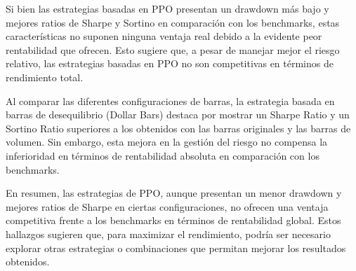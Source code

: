 \documentclass[a4paper,12pt, twoside]{report}
\begin{document}
Si bien las estrategias basadas en PPO presentan un drawdown más bajo y mejores ratios de Sharpe y Sortino en comparación 
con los benchmarks, estas características no suponen ninguna ventaja real debido a la evidente peor rentabilidad que ofrecen. 
Esto sugiere que, a pesar de manejar mejor el riesgo relativo, las estrategias basadas en PPO no son competitivas en términos 
de rendimiento total.

Al comparar las diferentes configuraciones de barras, la estrategia basada en barras de desequilibrio (Dollar Bars) 
destaca por mostrar un Sharpe Ratio y un Sortino Ratio superiores a los obtenidos con las barras originales y las barras de volumen. 
Sin embargo, esta mejora en la gestión del riesgo no compensa la inferioridad en términos de rentabilidad absoluta en comparación con los benchmarks.

En resumen, las estrategias de PPO, aunque presentan un menor drawdown y mejores ratios de Sharpe en ciertas 
configuraciones, no ofrecen una ventaja competitiva frente a los benchmarks en términos de rentabilidad global. 
Estos hallazgos sugieren que, para maximizar el rendimiento, podría ser necesario explorar otras estrategias o 
combinaciones que permitan mejorar los resultados obtenidos.
\end{document}
